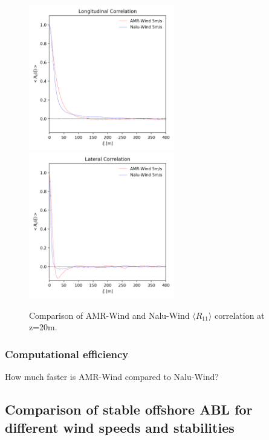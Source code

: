 \begin{figure} %
  \centering
  \\
  \includegraphics[width=2.5in]{figures/Compare_AMRWind_NaluWind/AMRWind_NaluWind_Lengthscale_Stable_z20_Longitudinal.png}
  \includegraphics[width=2.5in]{figures/Compare_AMRWind_NaluWind/AMRWind_NaluWind_Lengthscale_Stable_z20_Lateral.png}

  \caption{\label{fig:CompareAMRvsNaluRij}
    Comparison of AMR-Wind and Nalu-Wind $\langle R_{11}
    \rangle$ correlation at z=20m. }
\end{figure}

\subsubsection{Computational efficiency}
How much faster is AMR-Wind compared to Nalu-Wind?  \\

\subsection{Comparison of stable offshore ABL for different wind speeds and stabilities}

